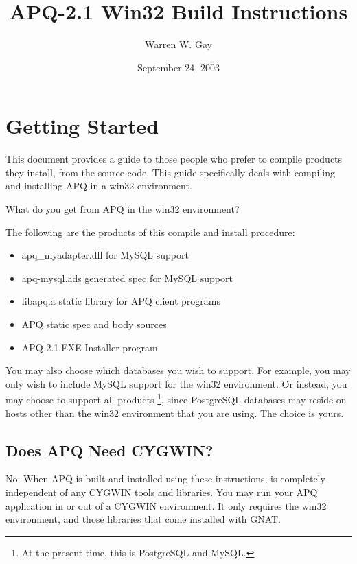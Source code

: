 \documentclass[english]{report}
\begin{document}
\title{APQ-2.1 Win32 Build Instructions}


\author{Warren W. Gay}


\date{September 24, 2003}

\maketitle

\chapter{Getting Started}

This document provides a guide to those people who prefer to compile
products they install, from the source code. This guide specifically
deals with compiling and installing APQ in a win32 environment.

What do you get from APQ in the win32 environment?

The following are the products of this compile and install procedure:

\begin{itemize}
\item apq\_myadapter.dll for MySQL support
\item apq-mysql.ads generated spec for MySQL support
\item libapq.a static library for APQ client programs
\item APQ static spec and body sources
\item APQ-2.1.EXE Installer program
\end{itemize}
You may also choose which databases you wish to support. For example,
you may only wish to include MySQL support for the win32 environment.
Or instead, you may choose to support all products%
\footnote{At the present time, this is PostgreSQL and MySQL.%
}, since PostgreSQL databases may reside on hosts other than the win32
environment that you are using. The choice is yours.


\section{Does APQ Need CYGWIN?}

No. When APQ is built and installed using these instructions, is completely
independent of any CYGWIN tools and libraries. You may run your APQ
application in or out of a CYGWIN environment. It only requires the
win32 environment, and those libraries that come installed with GNAT.
\end{document}
